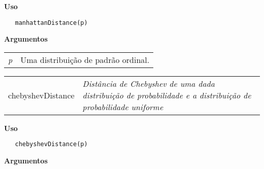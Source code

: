 \vspace{-0.5cm}

\hrulefill  

\vspace{0.5cm}

\textbf{Uso}

\begin{lstlisting}
   manhattanDistance(p)
\end{lstlisting}

\vspace{0.5cm}

\textbf{Argumentos}

\begin{table}[!ht]
\begin{center}
\begin{tabularx}{\textwidth}{X X}
\hspace{0.5cm} \textit{p} & Uma distribuição de padrão ordinal.\\
\end{tabularx}
\end{center}
\end{table} 

\hrulefill   

\begin{table}[!ht]
\begin{center}
\begin{tabularx}{\textwidth}{ X X}
\hspace{0.5cm} chebyshevDistance & \textit{Distância de Chebyshev de uma dada distribuição de probabilidade e a distribuição de probabilidade uniforme}\\
\end{tabularx}
\end{center}
\end{table} 

\vspace{-0.5cm}

\hrulefill  

\vspace{0.5cm}

\textbf{Uso}

\begin{lstlisting}
   chebyshevDistance(p)
\end{lstlisting}

\vspace{0.5cm}

\textbf{Argumentos}


